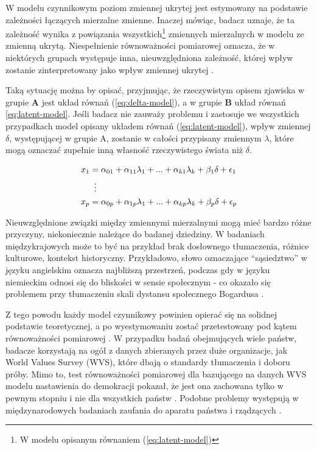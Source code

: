 \documentclass[12pt]{article}
\begin{document}
W modelu czynnikowym poziom zmiennej ukrytej jest estymowany na podstawie zależności łączących mierzalne zmienne. Inaczej mówiąc, badacz uznaje, że ta zależność wynika z powiązania wszystkich\footnote{W modelu opisanym równaniem (\ref{eq:latent-model})} zmiennych mierzalnych w modelu ze zmienną ukrytą. Niespełnienie równoważności pomiarowej oznacza, że w niektórych grupach występuje inna, nieuwzględniona zależność, której wpływ zostanie zinterpretowany jako wpływ zmiennej ukrytej \citep{HirBra}.

Taką sytuację można by opisać, przyjmując, że rzeczywistym opisem zjawiska w grupie \textbf{A} jest układ równań (\ref{eq:delta-model}), a w grupie \textbf{B} układ równań \ref{eq:latent-model}. Jeśli badacz nie zauważy problemu i zastosuje we wszystkich przypadkach model opisany układem równań (\ref{eq:latent-model}), wpływ zmiennej \(\delta\), występującej w grupie A, zostanie w całości przypisany zmiennym \(\lambda\), które mogą oznaczać zupełnie inną własność rzeczywistego świata niż \(\delta\).

\begin{align}
\label{eq:delta-model}
\begin{split}
x_1 &= \alpha_{01} + \alpha_{11} \lambda_1 + ... + \alpha_{k1} \lambda_k + \beta_1 \delta + \epsilon_1 \\
& \vdotswithin{=} \\
x_p &= \alpha_{0p} + \alpha_{1p} \lambda_1 + ... + \alpha_{kp} \lambda_k + \beta_p \delta + \epsilon_p \\
\end{split}
\end{align}

Nieuwzględnione związki między zmiennymi mierzalnymi mogą mieć bardzo różne przyczyny, niekoniecznie należące do badanej dziedziny. W badaniach międzykrajowych może to być na przykład brak dosłownego tłumaczenia, różnice kulturowe, kontekst historyczny. Przykładowo, słowo oznaczające ``sąsiedztwo'' w języku angielskim oznacza najbliższą przestrzeń, podczas gdy w języku niemieckim odnosi się do bliskości w sensie społecznym - co okazało się problemem przy tłumaczeniu skali dystansu społecznego Bogardusa \citep{Pokropek}.

Z tego powodu każdy model czynnikowy powinien opierać się na solidnej podstawie teoretycznej, a po wyestymowaniu zostać przetestowany pod kątem równoważności pomiarowej \citep{LubGlog}. W przypadku badań obejmujących wiele państw, badacze korzystają na ogół z danych zbieranych przez duże organizacje, jak World Values Survey (WVS), które dbają o standardy tłumaczenia i doboru próby. Mimo to, test równoważności pomiarowej dla bazującego na danych WVS modelu nastawienia do demokracji pokazał, że jest ona zachowana tylko w pewnym stopniu i nie dla wszystkich państw \citep{ArDav}. Podobne problemy występują w międzynarodowych badaniach zaufania do aparatu państwa i rządzących \citep{Schneider}.
\end{document}
